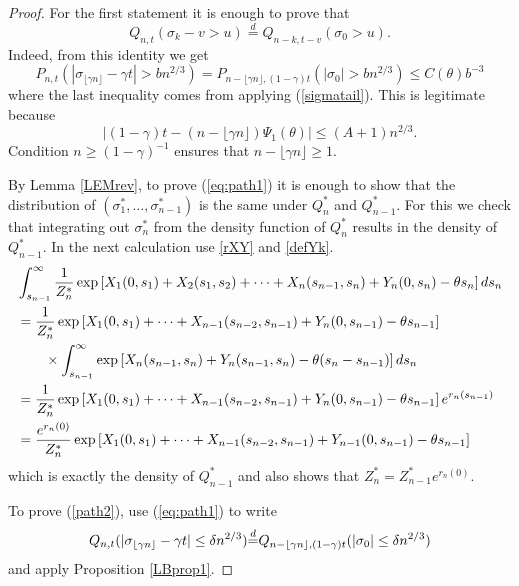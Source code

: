 \documentclass[11pt]{amsart}
\numberwithin{equation}{section}
\theoremstyle{remark}
\providecommand{\abs}[1]{\vert#1\vert}
\begin{document}
\begin{proof}
For the first statement it is enough to prove that 
\begin{equation} \label{eq:path1} Q_{n,t}(\sigma_k-v>u){\stackrel{d}{=}} Q_{n-k,t -v }(\sigma_0>u).\end{equation} 
Indeed, from this identity we get
\begin{equation}
P_{n,t}(|\sigma_{\lfloor\gamma n\rfloor}-\gamma t |>b n^{2/3})=P_{n-\lfloor\gamma n\rfloor, (1-\gamma)t} (|\sigma_0|>b n^{2/3})\le C({\theta}) b^{-3}
\end{equation}
where the last inequality comes from  applying (\ref{sigmatail}).  This is legitimate
because 
\[\abs{(1-\gamma)t-(n-\lfloor\gamma n\rfloor){\Psi_1}({\theta})}\le (A+1)n^{2/3}.\]  
Condition $n\ge (1-\gamma)^{-1}$ ensures that $n-\lfloor\gamma n\rfloor\ge 1$.

By Lemma \ref{LEMrev}, to prove (\ref{eq:path1})   it is enough to show that the  distribution of $(\sigma_1^*,\dots, \sigma_{n-1}^*)$ is the same under $Q^*_n$ and $Q^*_{n-1}$.  For this   
 we check that integrating out $\sigma_{n}^*$ from the density function of $Q^*_n$ results 
in the density of $Q^*_{n-1}$.  In the next calculation use \eqref{rXY} and \eqref{defYk}. 
\begin{align*}
&\int_{s_{n-1}}^{\infty}\frac1{Z_n^*} \exp\left[ X_1(0,s_1)+X_2(s_1,s_2)+\dotsm+ X_n(s_{n-1},s_{n})+Y_n(0,s_{n})-{\theta} s_{n}\right] ds_{n}\\ 
&  =\frac1{Z_n^*} \exp\left[ X_1(0,s_1) +\dotsm+ X_{n-1} (s_{n-2},s_{n-1})+Y_n(0,s_{n-1})-{\theta} s_{n-1}\right] \\ {\nonumber}
& \qquad \times
\int_{s_{n-1}}^\infty  \exp\left[X_{n}(s_{n-1},s_n)+Y_n(s_{n-1}, s_n)-{\theta} (s_n-s_{n-1}) \right]ds_{n}\\
& =
\frac1{Z_n^*} \exp\left[ X_1(0,s_1) +\dotsm+ X_{n-1} (s_{n-2},s_{n-1})+Y_n(0,s_{n-1})-{\theta} s_{n-1}\right] e^{r_n(s_{n-1})}{\nonumber}
\\
& =\frac{e^{r_n(0)}}{Z_n^*} \exp\left[ X_1(0,s_1) +\dotsm+ X_{n-1} (s_{n-2},s_{n-1})+Y_{n-1}(0,s_{n-1})-{\theta} s_{n-1}\right] {\nonumber}
\end{align*}
which is exactly the density of $Q^*_{n-1}$ and also shows that $Z_n^*=Z_{n-1}^* e^{r_{n}(0)}$.

 To prove   (\ref{path2}), use  (\ref{eq:path1}) to write 
\begin{equation}{\nonumber} 
Q_{n,t}(|\sigma_{\lfloor \gamma n\rfloor} -\gamma t|\le \delta n^{2/3}){\stackrel{d}{=}} Q_{n-\lfloor \gamma n\rfloor,(1-\gamma)t}(|\sigma_{0} |\le \delta n^{2/3})
\end{equation} 
and apply Proposition \ref{LBprop1}.
 \end{proof}
\end{document}
